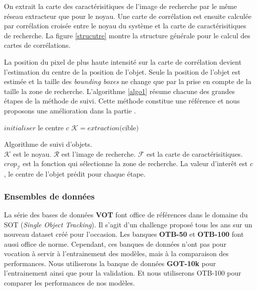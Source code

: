 \documentclass[10pt,twocolumn,letterpaper,french]{article}
\begin{document}
On extrait la carte des caractérisitiques de l'image de recherche par le même réseau extracteur que pour le noyau. Une carte de corrélation est ensuite calculée par corrélation croisée entre le noyau du système et la carte de caractérisitiques de recherche. La figure \ref{strucutre} montre la structure générale pour le calcul des cartes de corrélations.

La position du pixel de plus haute intensité sur la carte de corrélation devient l'estimation du centre de la position de l'objet. Seule la position de l'objet est estimée et la taille des \textit{bounding boxes} ne change que par la prise en compte de la taille la zone de recherche. L'algorithme \ref{algo1} résume chacune des grandes étapes de la méthode de suivi. Cette méthode constitue une référence et nous proposons une amélioration dans la partie \textit{}.


\begin{algorithm}
\SetAlgoLined
 $initialiser$ le centre $c$\;
 $\mathcal{K} = extraction($cible$)$\;
\caption{Algorithme de suivi d'objets.\\$\mathcal{K}$ est le noyau. $\mathcal{R}$ est l'image de recherche. $\mathcal{F}$ est la carte de caractérisitiques. $crop_{\mathcal{I}}$ est la fonction qui sélectionne la zone de recherche. La valeur d'interêt est $c$, le centre de l'objet prédit pour chaque étape.}
\label{algo1}
\end{algorithm}




\subsubsection*{Ensembles de données}

La série des bases de données \textbf{VOT} \cite{VOT} font office de références dans le domaine du SOT (\textit{Single Object Tracking}). Il s'agit d'un challenge proposé tous les ans sur un nouveau dataset créé pour l'occasion. Les banques \textbf{OTB-50} et \textbf{OTB-100} \cite{OTB} font aussi office de norme. Cependant, ces banques de données n'ont pas pour vocation à servir à l'entrainement des modèles, mais à la comparaison des performances. Nous utiliserons la banque de données \textbf{GOT-10k} \cite{GOT10K} pour l'entrainement ainsi que pour la validation. Et nous utiliserons OTB-100 pour comparer les performances de nos modèles.
\end{document}
